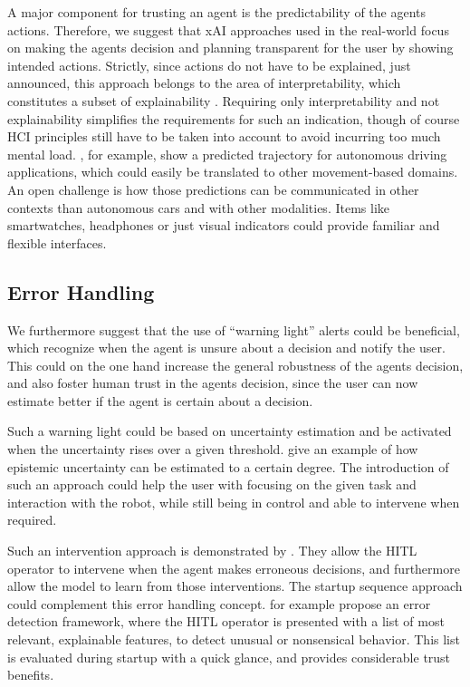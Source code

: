 \documentclass[twoside,11pt]{article}
\begin{document}
\begin{enumerate}
A major component for trusting an agent is the predictability of the agents actions. Therefore, we suggest that xAI approaches used in the real-world focus on making the agents decision and planning transparent for the user by showing intended actions. Strictly, since actions do not have to be explained, just announced, this approach belongs to the area of interpretability, which constitutes a subset of explainability \citep{Dragan:2015:LegibleRobotMotion}. Requiring only interpretability and not explainability simplifies the requirements for such an indication, though of course HCI principles still have to be taken into account to avoid incurring too much mental load. \citet{Caltagarione:2017:DrivingPathGeneration}, for example, show a predicted trajectory for autonomous driving applications, which could easily be translated to other movement-based domains. 
An open challenge is how those predictions can be communicated in other contexts than autonomous cars and with other modalities. Items like smartwatches, headphones or just visual indicators could provide familiar and flexible interfaces.

\subsection{Error Handling}
We furthermore suggest that the use of ``warning light'' alerts could be beneficial, which recognize when the agent is unsure about a decision and notify the user. This could on the one hand increase the general robustness of the agents decision, and also foster human trust in the agents decision, since the user can now estimate better if the agent is certain about a decision.

Such a warning light could be based on uncertainty estimation and be activated when the uncertainty rises over a given threshold. \citet{JainEtAl:2021:EpistemicUncertaintyPrediction} give an example of how epistemic uncertainty can be estimated to a certain degree. The introduction of such an approach could help the user with focusing on the given task and interaction with the robot, while still being in control and able to intervene when required.

Such an intervention approach is demonstrated by \citet{WuEtAl:2021:HITLDRLAutonomousDriving}. They allow the HITL operator to intervene when the agent makes erroneous decisions, and furthermore allow the model to learn from those interventions. 
The startup sequence approach could complement this error handling concept. \citet{LiuGuoMahmud:2021:HITLErrorDetectionFramework} for example propose an error detection framework, where the HITL operator is presented with a list of most relevant, explainable features, to detect unusual or nonsensical behavior. This list is evaluated during startup with a quick glance, and provides considerable trust benefits.\\



\end{enumerate}
\end{document}
